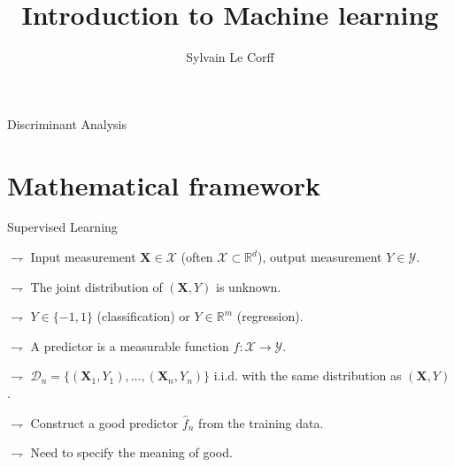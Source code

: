 \documentclass[xcolor={usenames,dvipsnames},handout]{beamer}
\begin{document}
\title[]{Introduction to Machine learning}
\author[S.~Le Corff]{Sylvain Le Corff}
\date{}

\begin{frame}[plain]
\titlepage
\end{frame}


\begin{frame}{Discriminant Analysis}
\tableofcontents
\end{frame}



\section{Mathematical framework}


\begin{frame}{Supervised  Learning}

$\rightharpoondown$ \alert{Input} measurement $\textbf{X}  \in \mathcal{X}$ (often $\mathcal{X} \subset \mathbb{R}^d$), \alert{output} measurement $Y \in \mathcal{Y}$.

$\rightharpoondown$  The joint distribution of $(\textbf{X},Y)$ is  \alert{unknown}.

$\rightharpoondown$  $Y \in \{-1,1\}$ (classification) or $Y \in \mathbb{R}^m$ (regression).


$\rightharpoondown$ A \alert{predictor} is a measurable function $f:\mathcal{X} \to \mathcal{Y}$.

\vspace{.5cm}


$\rightharpoondown$ $\mathcal{D}_n=\{(\textbf{X}_1, Y_1),\ldots,(\textbf{X}_n, Y_n)\}$ i.i.d. with the same distribution as $(\textbf{X},Y)$.




\vspace{.5cm}


$\rightharpoondown$  Construct a \alert{good} predictor $\widehat{f}_n$ from the training data.

$\rightharpoondown$  Need to specify the meaning of good.

\end{frame}
\end{document}
